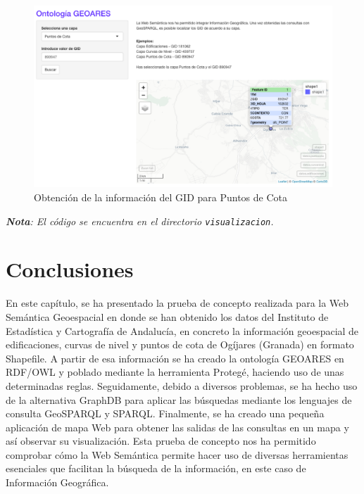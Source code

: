 \begin{figure}[H]
	\centering
	\includegraphics[width=1\linewidth]{imagenes/capitulo5/R4}
	\caption{Obtención de la información del GID para Puntos de Cota}
	\label{fig:r4}
\end{figure}



\textit{\textbf{Nota}: El código se encuentra en el directorio \texttt{visualizacion}.}\\





\section{Conclusiones}

En este capítulo, se ha presentado la prueba de concepto realizada para la Web Semántica Geoespacial en donde se han obtenido los datos del Instituto de Estadística y Cartografía de Andalucía, en concreto la información geoespacial de edificaciones, curvas de nivel y puntos de cota de Ogíjares (Granada) en formato Shapefile. A partir de esa información se ha creado la ontología GEOARES en RDF/OWL y poblado mediante la herramienta Protegé, haciendo uso de unas determinadas reglas. Seguidamente, debido a diversos problemas, se ha hecho uso de la alternativa GraphDB para aplicar las búsquedas mediante los lenguajes de consulta GeoSPARQL y SPARQL. Finalmente, se ha creado una pequeña aplicación de mapa Web para obtener las salidas de las consultas en un mapa y así observar su visualización. Esta prueba de concepto nos ha permitido comprobar cómo la Web Semántica permite hacer uso de diversas herramientas esenciales que facilitan la búsqueda de la información, en este caso de Información Geográfica.







